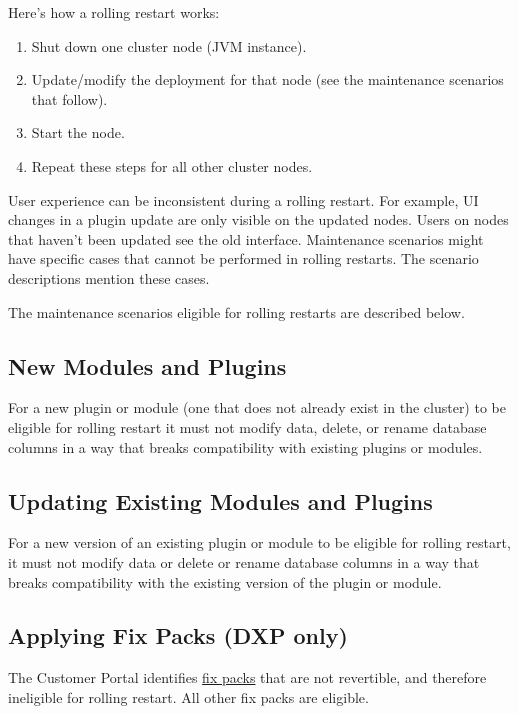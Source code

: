 Here's how a rolling restart works:

\begin{enumerate}
\def\labelenumi{\arabic{enumi}.}
\item
  Shut down one cluster node (JVM instance).
\item
  Update/modify the deployment for that node (see the maintenance
  scenarios that follow).
\item
  Start the node.
\item
  Repeat these steps for all other cluster nodes.
\end{enumerate}

User experience can be inconsistent during a rolling restart. For
example, UI changes in a plugin update are only visible on the updated
nodes. Users on nodes that haven't been updated see the old interface.
Maintenance scenarios might have specific cases that cannot be performed
in rolling restarts. The scenario descriptions mention these cases.

The maintenance scenarios eligible for rolling restarts are described
below.

\subsection{New Modules and Plugins}\label{new-modules-and-plugins}

For a new plugin or module (one that does not already exist in the
cluster) to be eligible for rolling restart it must not modify data,
delete, or rename database columns in a way that breaks compatibility
with existing plugins or modules.

\subsection{Updating Existing Modules and
Plugins}\label{updating-existing-modules-and-plugins}

For a new version of an existing plugin or module to be eligible for
rolling restart, it must not modify data or delete or rename database
columns in a way that breaks compatibility with the existing version of
the plugin or module.

\subsection{Applying Fix Packs (DXP
only)}\label{applying-fix-packs-dxp-only}

The Customer Portal identifies
\href{/docs/7-0/deploy/-/knowledge_base/d/maintaining-liferay}{fix
packs} that are not revertible, and therefore ineligible for rolling
restart. All other fix packs are eligible.

